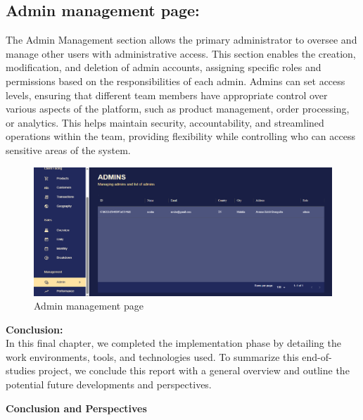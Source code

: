 \subsection{Admin management page:}

The Admin Management section allows the primary administrator to oversee and manage other users with administrative access. This section enables the creation, modification, and deletion of admin accounts, assigning specific roles and permissions based on the responsibilities of each admin. Admins can set access levels, ensuring that different team members have appropriate control over various aspects of the platform, such as product management, order processing, or analytics. This helps maintain security, accountability, and streamlined operations within the team, providing flexibility while controlling who can access sensitive areas of the system.

\begin{figure}[!h]
\begin{center}
\includegraphics{images/Admin management page.png}
\end{center}
\caption{Admin management page}
\end{figure}

\newpage
{}
{\Large \textbf{Conclusion:}}\\

In this final chapter, we completed the implementation phase by detailing the work environments, tools, and technologies used. To summarize this end-of-studies project, we conclude this report with a general overview and outline the potential future developments and perspectives.\\

\newpage
{}
\begin{center}
    {\huge \textbf{Conclusion and Perspectives}}\\
\end{center}

